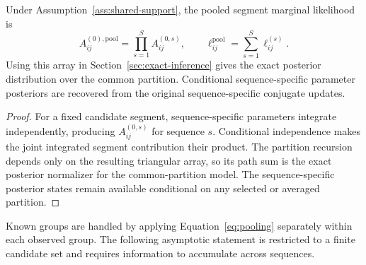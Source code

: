 \begin{theorem}
\label{thm:pooling-paper}
Under Assumption~\ref{ass:shared-support}, the pooled segment marginal likelihood is
\begin{equation}
 A^{(0),\mathrm{pool}}_{ij}=\prod_{s=1}^{S}A^{(0,s)}_{ij},
 \qquad
 \ell^{\mathrm{pool}}_{ij}=\sum_{s=1}^{S}\ell^{(s)}_{ij}.
\label{eq:pooling}
\end{equation}
Using this array in Section~\ref{sec:exact-inference} gives the exact posterior distribution over the common partition. Conditional sequence-specific parameter posteriors are recovered from the original sequence-specific conjugate updates.
\end{theorem}
\begin{proof}
For a fixed candidate segment, sequence-specific parameters integrate independently, producing $A^{(0,s)}_{ij}$ for sequence $s$. Conditional independence makes the joint integrated segment contribution their product. The partition recursion depends only on the resulting triangular array, so its path sum is the exact posterior normalizer for the common-partition model. The sequence-specific posterior states remain available conditional on any selected or averaged partition.
\end{proof}

Known groups are handled by applying Equation~\eqref{eq:pooling} separately within each observed group. The following asymptotic statement is restricted to a finite candidate set and requires information to accumulate across sequences.

